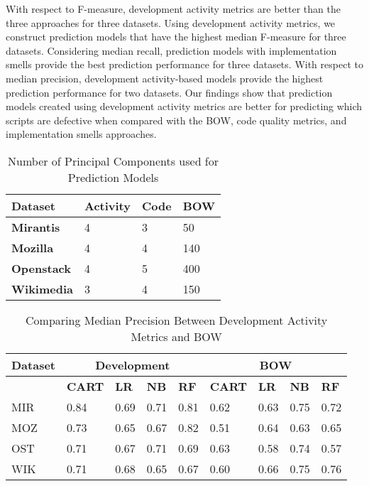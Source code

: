 \documentclass[smallextended]{svjour3}       %
\begin{document}
With respect to F-measure, development activity metrics are better than the three approaches for three datasets. Using development activity metrics, we construct prediction models that have the highest median F-measure for three datasets. Considering median recall, prediction models with implementation smells provide the best prediction performance for three datasets. With respect to median precision, development activity-based models provide the highest prediction performance for two datasets. Our findings show that prediction models created using development activity metrics are better for predicting which scripts are defective when compared with the BOW, code quality metrics, and implementation smells approaches.      

\begin{table}[]
\centering
\caption{Number of Principal Components used for Prediction Models}
\label{res-rq2-pca}
\footnotesize
{
\begin{tabular}{ p{3.5cm}  p{1cm} p{1cm} p{3.5cm} }
\hline
\textbf{Dataset}   & \textbf{Activity} & \textbf{Code} & \textbf{BOW} \\
\hline
\textbf{Mirantis}  & 4 & 3 &  50 \\
\textbf{Mozilla}   & 4 & 4 &  140\\
\textbf{Openstack} & 4 & 5 &  400\\
\textbf{Wikimedia} & 3 & 4 &  150\\
\hline
\end{tabular}
}
\end{table}


\begin{table*}[]
\centering
\caption{Comparing Median Precision Between Development Activity Metrics and BOW}
\label{res:rq1:table:pre:bow}
\footnotesize{  
\begin{tabular}{p{1.2cm} p{0.9cm} p{0.9cm} p{0.9cm} p{0.9cm} p{0.9cm} p{0.6cm} p{0.6cm} p{0.6cm}  }
\hline
\textbf{Dataset} & \multicolumn{4}{c}{\textbf{Development}} & \multicolumn{4}{c}{\textbf{BOW}}  \\
\hline
 &  \textbf{CART} & \textbf{LR} & \textbf{NB} & \textbf{RF} & \textbf{CART} & \textbf{LR} & \textbf{NB} & \textbf{RF}  \\
\hline
MIR & \cellcolor{lightgray} 0.84 & 0.69 & 0.71 &  0.81                       & 0.62 & 0.63 & 0.75 & 0.72    \\
MOZ & 0.73                       & 0.65 & 0.67 & \cellcolor{lightgray}  0.82 & 0.51 & 0.64 & 0.63 & 0.65    \\
OST & 0.71                       & 0.67 & 0.71 & 0.69                        & 0.63 & 0.58 & \cellcolor{lightgray} 0.74 & 0.57   \\
WIK & 0.71                       & 0.68 & 0.65 & 0.67                        & 0.60 & 0.66 & 0.75 & \cellcolor{lightgray} 0.76   \\
\hline
\end{tabular}
}
\end{table*} 
\end{document}
